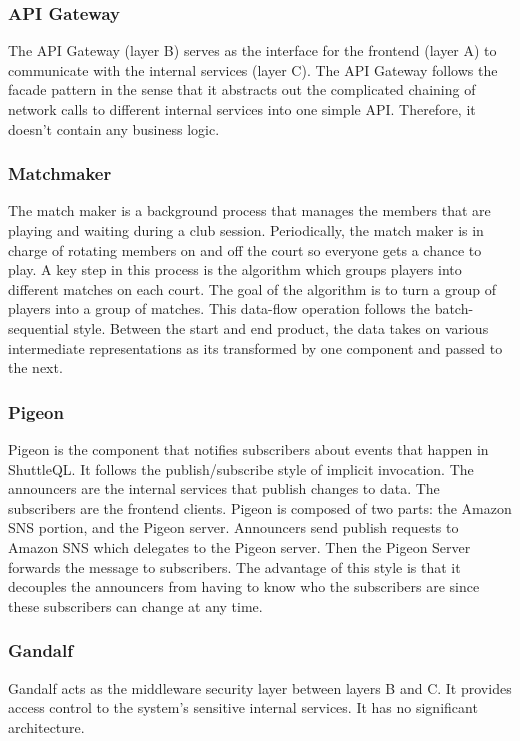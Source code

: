 \documentclass{article}
\begin{document}
\subsubsection{API Gateway}
The API Gateway (layer B) serves as the interface for the frontend (layer A) to communicate with the internal services (layer C). The API Gateway follows the facade pattern in the sense that it abstracts out the complicated chaining of network calls to different internal services into one simple API. Therefore, it doesn't contain any business logic.

\subsubsection{Matchmaker}
The match maker is a background process that manages the members that are playing and waiting during a club session. Periodically, the match maker is in charge of rotating members on and off the court so everyone gets a chance to play. A key step in this process is the algorithm which groups players into different matches on each court. The goal of the algorithm is to turn a group of players into a group of matches. This data-flow operation follows the batch-sequential style. Between the start and end product, the data takes on various intermediate representations as its transformed by one component and passed to the next.

\subsubsection{Pigeon}
Pigeon is the component that notifies subscribers about events that happen in ShuttleQL. It follows the publish/subscribe style of implicit invocation. The announcers are the internal services that publish changes to data. The subscribers are the frontend clients. Pigeon is composed of two parts: the Amazon SNS portion, and the Pigeon server. Announcers send publish requests to Amazon SNS which delegates to the Pigeon server. Then the Pigeon Server forwards the message to subscribers. The advantage of this style is that it decouples the announcers from having to know who the subscribers are since these subscribers can change at any time.

\subsubsection{Gandalf}
Gandalf acts as the middleware security layer between layers B and C. It provides access control to the system's sensitive internal services. It has no significant architecture.
\end{document}
